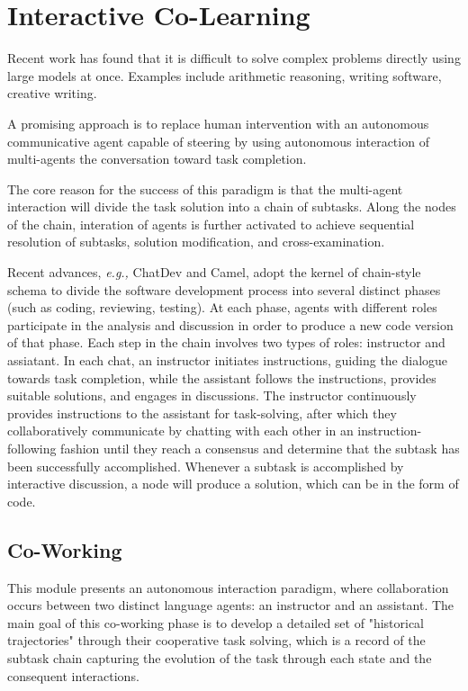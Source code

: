 \documentclass[11pt]{article}
\title{}
\author{}
\newcommand{\eg}{\textit{e.g., }}
\begin{document}
\maketitle

\clearpage
\section{Interactive Co-Learning}
Recent work has found that it is difficult to solve complex problems directly using large models at once. Examples include arithmetic reasoning, writing software, creative writing.

A promising approach is to replace human intervention with an autonomous communicative agent capable of steering by using autonomous interaction of multi-agents the conversation toward task completion.

The core reason for the success of this paradigm is that the multi-agent interaction will divide the task solution into a chain of subtasks. Along the nodes of the chain, interation of agents is further activated to achieve sequential resolution of subtasks, solution modification, and cross-examination.

Recent advances, \eg ChatDev and Camel, adopt the kernel of chain-style schema to divide the software development process into several distinct phases (such as coding, reviewing, testing). At each phase, agents with different roles participate in the analysis and discussion in order to produce a new code version of that phase.
Each step in the chain involves two types of roles: instructor and assiatant.
In each chat, an instructor initiates instructions, guiding the dialogue towards task completion, while the assistant follows the instructions, provides suitable solutions, and engages in discussions.
The instructor continuously provides instructions to the assistant for task-solving, after which they collaboratively communicate by chatting with each other in an instruction-following fashion until they reach a consensus and determine that the subtask has been successfully accomplished.
Whenever a subtask is accomplished by interactive discussion, a node will produce a solution, which can be in the form of code.


\subsection{Co-Working}
This module presents an autonomous interaction paradigm, where collaboration occurs between two distinct language agents: an instructor and an assistant. The main goal of this co-working phase is to develop a detailed set of "historical trajectories" through their cooperative task solving, which is a record of the subtask chain capturing the evolution of the task through each state and the consequent interactions.
\end{document}
